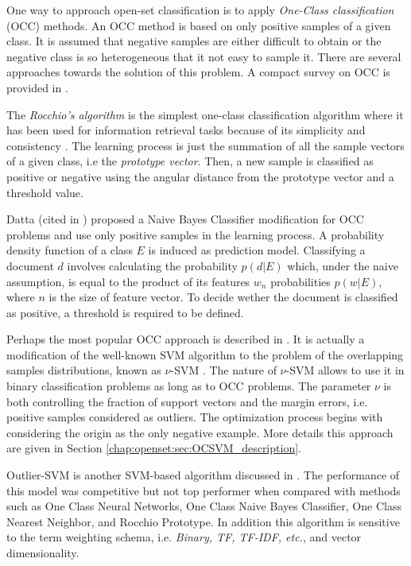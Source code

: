 One way to approach open-set classification is to apply \textit{One-Class classification} (OCC) methods. An OCC method is based on only positive samples of a given class. It is assumed that negative samples are either difficult to obtain or the negative class is so heterogeneous that it not easy to sample it. There are several approaches towards the solution of this problem. A compact survey on OCC is provided in \parencite{khan2010survey}. 

The \textit{Rocchio's algorithm} is the simplest one-class classification algorithm where it has been used for information retrieval tasks because of its simplicity and consistency \parencite{joachims1997probabilistic}. The learning process is just the summation of all the sample vectors of a given class, i.e the \textit{prototype vector}. Then, a new sample is classified as positive or negative using the angular distance from the prototype vector and a threshold value.

Datta (cited in \parencite{manevitz2002one}) proposed a Naive Bayes Classifier modification for OCC problems and use only positive samples in the learning process. A probability density function of a class $E$ is induced as prediction model. Classifying a document $d$ involves calculating the probability $p(d|E)$ which, under the naive assumption, is equal to the product of its features $w_{n}$ probabilities $p(w|E)$, where $n$ is the size of feature vector. To decide wether the document is classified as positive, a threshold is required to be defined. 

Perhaps the most popular OCC approach is described in \parencite{scholkopf1999estimating}. It is actually a modification of the well-known SVM algorithm to the problem of the overlapping samples distributions, known as $\nu$-SVM \parencite{bishop2006}. The nature of $\nu$-SVM allows to use it in binary classification problems as long as to OCC problems. The parameter $\nu$ is both controlling the fraction of support vectors and the margin errors, i.e. positive samples considered as outliers. The optimization process begins with considering the origin as the only negative example. More details this approach are given in Section \ref{chap:openset:sec:OCSVM_description}.

Outlier-SVM is another SVM-based algorithm discussed in \parencite{manevitz2002one,khan2010survey}. The performance of this model was competitive but not top performer when compared with methods such as One Class Neural Networks, One Class Naive Bayes Classifier, One Class Nearest Neighbor, and Rocchio Prototype. In addition this algorithm is sensitive to the term weighting schema, i.e. \textit{Binary, TF, TF-IDF, etc.}, and vector dimensionality. 

